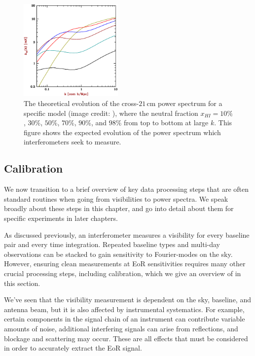 \begin{figure}
    \centering
    \includegraphics[width=0.45\textwidth]{plots/PS_evolution.eps}
    \caption{The theoretical evolution of the cross-$21$\,cm power spectrum for a specific model (image credit: \citet{barkana2009}), where the neutral fraction $x_{HI} = 10\%$, $30\%$, $50\%$, $70\%$, $90\%$, and $98\%$ from top to bottom at large $k$. This figure shows the expected evolution of the power spectrum which interferometers seek to measure.}
    \label{fig:PS_evolution}
\end{figure}

\subsection{Calibration}
\label{sec:calibration_intro}

We now transition to a brief overview of key data processing steps that are often standard routines when going from visibilities to power spectra. We speak broadly about these steps in this chapter, and go into detail about them for specific experiments in later chapters.

As discussed previously, an interferometer measures a visibility for every baseline pair and every time integration. Repeated baseline types and multi-day observations can be stacked to gain sensitivity to Fourier-modes on the sky. However, ensuring clean measurements at EoR sensitivities requires many other crucial processing steps, including calibration, which we give an overview of in this section.

We've seen that the visibility measurement is dependent on the sky, baseline, and antenna beam, but it is also affected by instrumental systematics. For example, certain components in the signal chain of an instrument can contribute variable amounts of noise, additional interfering signals can arise from reflections, and blockage and scattering may occur. These are all effects that must be considered in order to accurately extract the EoR signal. 

